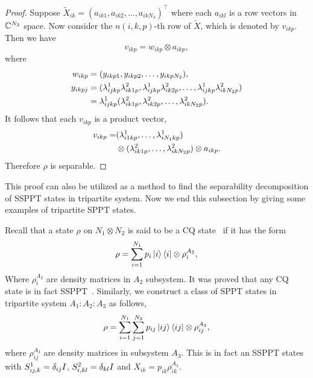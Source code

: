 \begin{proof}
     Suppose $\tilde X_{ik} = {(a_{ik1},a_{ik2},\ldots,a_{ikN_3})}^\intercal$ where each $a_{ikl}$ is a row vectors in
     $\mathbb{C}^{N_3}$ space. Now
     consider the \linebreak$n(i,k,p)$-th  row of $\tilde X$, which is denoted by
     $v_{ikp}$.
     Then we have
     \begin{equation}
       \label{eq:31}
       v_{ikp} = w_{ikp}\otimes a_{ikp},
     \end{equation}
     where
     \begin{align*}
       w_{ikp} &= (y_{ikp1},y_{ikp2},\ldots, y_{ikpN_2}),\\
       y_{ikpj}& = (\lambda^{1}_{ijk p}\lambda^{2}_{ik1 p},\lambda^{1}_{ijk p}\lambda^{2}_{ik2 p},\ldots,\lambda^{1}_{ijk p}\lambda^{2}_{ikN_2 p})\\
               & = \lambda^{1}_{ijk p}(\lambda^{2}_{ik1 p},\lambda^{2}_{ik2 p},\ldots,\lambda^{2}_{ikN_2 p}).
     \end{align*}
     It follows that each $v_{ikp}$ is a product vector,
     \begin{equation}
       \label{eq:32}
       \begin{split}
         v_{ikp} =& (\lambda^{1}_{i1k p},\ldots,\lambda^{1}_{iN_1k p})\\
         &\otimes
       (\lambda^{2}_{ik1 p},\ldots,\lambda^{2}_{ikN_2 p})\otimes a_{ikp}.
       \end{split}
     \end{equation}
    Therefore  $\rho$ is separable.
   \end{proof}
   This proof can also be utilized as  a method to find the separability decomposition  of  SSPPT states in tripartite
   system.
   Now we end this subsection by giving some examples of tripartite SPPT states.
   \begin{example}
   Recall that a state $\rho$ on $N_1\otimes N_2$ is said to be a CQ state~\cite{Piani2008} if it has the form
   \begin{equation}
     \label{multiSPPTv0.5:eq:1}
     \rho = \sum_{i=1}^{N_1} p_i \ket{i}\bra{i} \otimes \rho_i^{A_2},
   \end{equation}
   Where $\rho_i^{A_2}$ are  density matrices in $A_2$ subsystem. 
   It was proved that any CQ state is in fact SSPPT~\cite{Piani2008}. Similarly, we construct  a
   class of SPPT states  in  tripartite system $A_1:A_2:A_3$ as follows,
   \begin{equation}
     \label{multiSPPTv0.5:eq:2}
     \rho = \sum_{i=1}^{N_1}\sum_{j=1}^{N_2} p_{ij} \ket{ij}\bra{ij}\otimes \rho_{ij}^{A_3},
   \end{equation}
   where $\rho_{ij}^{A_3}$ are density matrices in subsystem $A_3$. 
   This is in fact an SSPPT states with  $ S^1_{ij,k} =\delta_{ij}I$,  $S^2_{i,kl}=\delta_{kl}I$ and $X_{ik} = p_{ik}\rho_{ik}^{A_3}$.
 \end{example}
